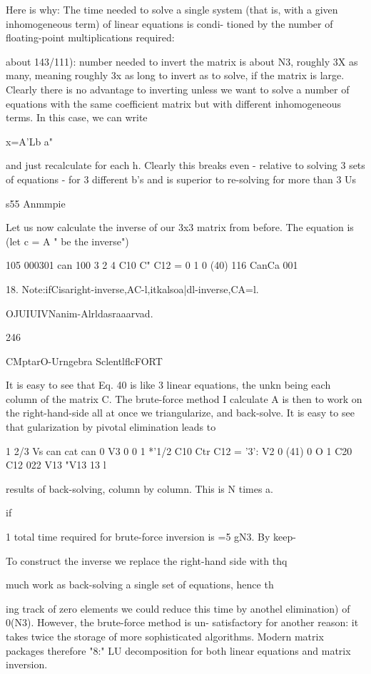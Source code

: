 Here is why: The time needed to solve a single system (that is,
with a given inhomogeneous term) of linear equations is condi-
tioned by the number of floating-point multiplications required:

about 143/111): number needed to invert the matrix is about N3,
roughly 3X as many, meaning roughly 3x as long to invert as to
solve, if the matrix is large. Clearly there is no advantage to
inverting unless we want to solve a number of equations with the
same coefficient matrix but with different inhomogeneous terms.
In this case, we can write

x=A'Lb a"

and just recalculate for each h. Clearly this breaks even - relative
to solving 3 sets of equations - for 3 different b's and is superior
to re-solving for more than 3 Us

s55 Anmmpie

Let us now calculate the inverse of our 3x3 matrix from before.
The equation is (let c = A " be the inverse")

105 000301 can 100
3 2 4 C10 C" C12 = 0 1 0 (40)
116 CanCa 001

 

18. Note:ifCisaright-inverse,AC-l,itkalsoa|dl-inverse,CA=l.

OJUIUIVNanim-Alrldasraaarvad.

246

CMptarO-Urngebra SclentlflcFORT

It is easy to see that Eq. 40 is like 3 linear equations, the unkn
being each column of the matrix C. The brute-force method I
calculate A is then to work on the right-hand-side all at once
we triangularize, and back-solve. It is easy to see that
gularization by pivotal elimination leads to

1 2/3 Vs can cat can 0 V3 0
0 1 *'1/2 C10 Ctr C12 = '3': V2 0 (41)
0 O 1 C20 C12 022 V13 "V13  13 l

results of back-solving, column by column. This is N times a.

if

1
total time required for brute-force inversion is =5 gN3. By keep-

To construct the inverse we replace the right-hand side with thq

much work as back-solving a single set of equations, hence th

ing track of zero elements we could reduce this time by anothel
elimination) of 0(N3). However, the brute-force method is un-
satisfactory for another reason: it takes twice the storage of more
sophisticated algorithms. Modern matrix packages therefore "8:"
LU decomposition for both linear equations and matrix inversion.

